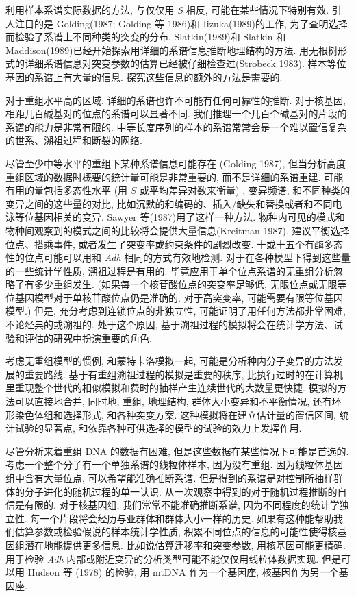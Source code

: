 \documentclass[12pt]{article}
\begin{document}
利用样本系谱实际数据的方法, 与仅仅用 \textit{S} 相反, 可能在某些情况下特别有效. 引人注目的是 Golding(1987; Golding 等
1986)和 Iizuka(1989)的工作, 为了查明选择而检验了系谱上不同种类的突变的分布. Slatkin(1989)和 Slatkin 和
Maddison(1989)已经开始探索用详细的系谱信息推断地理结构的方法.
用无根树形式的详细系谱信息对突变参数的估算已经被仔细检查过(Strobeck 1983). 样本等位基因的系谱上有大量的信息.
探究这些信息的额外的方法是需要的.

对于重组水平高的区域, 详细的系谱也许不可能有任何可靠性的推断. 对于核基因, 相距几百碱基对的位点的系谱可以显著不同.
我们推理一个几百个碱基对的片段的系谱的能力是非常有限的.
中等长度序列的样本的系谱常常会是一个难以置信复杂的世系、溯祖过程和断裂的网络.

尽管至少中等水平的重组下某种系谱信息可能存在 (Golding 1987), 但当分析高度重组区域的数据时概要的统计量可能是非常重要的,
而不是详细的系谱重建. 可能有用的量包括多态性水平 (用 $S$ 或平均差异对数来衡量) , 变异频谱,
和不同种类的变异之间的这些量的对比, 比如沉默的和编码的、插入/缺失和替换或者和不同电泳等位基因相关的变异. Sawyer
等(1987)用了这样一种方法. 物种内可见的模式和物种间观察到的模式之间的比较将会提供大量信息(Kreitman 1987),
建议平衡选择位点、搭乘事件, 或者发生了突变率或约束条件的剧烈改变.
十或十五个有酶多态性的位点可能可以用和 \textit{Adh} 相同的方式有效地检测. 对于在各种模型下得到这些量的一些统计学性质,
溯祖过程是有用的. 毕竟应用于单个位点系谱的无重组分析忽略了有多少重组发生. (如果每一个核苷酸位点的突变率足够低,
无限位点或无限等位基因模型对于单核苷酸位点仍是准确的. 对于高突变率, 可能需要有限等位基因模型.) 但是,
充分考虑到连锁位点的非独立性, 可能证明了用任何方法都非常困难, 不论经典的或溯祖的. 处于这个原因,
基于溯祖过程的模拟将会在统计学方法、试验和评估的研究中扮演重要的角色.

考虑无重组模型的惯例, 和蒙特卡洛模拟一起, 可能是分析种内分子变异的方法发展的重要路线.
基于有重组溯祖过程的模拟是重要的秩序, 比执行过时的在计算机里重现整个世代的相似模拟和费时的抽样产生连续世代的大数量更快捷.
模拟的方法可以直接地合并, 同时地, 重组, 地理结构, 群体大小变异和不平衡情况, 还有环形染色体组和选择形式, 和各种突变方案.
这种模拟将在建立估计量的置信区间, 统计试验的显著点, 和依靠各种可供选择的模型的试验的效力上发挥作用.

尽管分析来着重组 DNA 的数据有困难, 但是这些数据在某些情况下可能是首选的. 考虑一个整个分子有一个单独系谱的线粒体样本,
因为没有重组. 因为线粒体基因组中含有大量位点, 可以希望能准确推断系谱.
但是得到的系谱是对控制所抽样群体的分子进化的随机过程的单一认识. 从一次观察中得到的对于随机过程推断的自信是有限的.
对于核基因组, 我们常常不能准确推断系谱, 因为不同程度的统计学独立性. 每一个片段将会经历与亚群体和群体大小一样的历史.
如果有这种能帮助我们估算参数或检验假说的样本统计学性质, 积累不同位点的信息的可能性使得核基因组潜在地能提供更多信息.
比如说估算迁移率和突变参数, 用核基因可能更精确.
用于检验 \textit{Adh} 内部或附近变异的分析类型可能不能仅仅用线粒体数据实现. 但是可以用 Hudson 等 (1978) 的检验, 用
mtDNA 作为一个基因座, 核基因作为另一个基因座.
\end{document}
